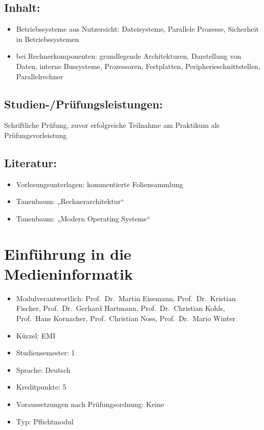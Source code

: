 \section*{Inhalt:}\label{inhalt-8}

\begin{itemize}
\tightlist
\item
  Betriebssysteme aus Nutzersicht: Dateisysteme, Parallele Prozesse,
  Sicherheit in Betriebssystemen
\item
  bei Rechnerkomponenten: grundlegende Architekturen, Darstellung von
  Daten, interne Bussysteme, Prozessoren, Festplatten,
  Peripherieschnittstellen, Parallelrechner
\end{itemize}

\section*{Studien-/Prüfungsleistungen:}\label{studien-pruxfcfungsleistungen-7}

Schriftliche Prüfung, zuvor erfolgreiche Teilnahme am Praktikum als
Prüfungsvorleistung

\section*{Literatur:}\label{literatur-6}

\begin{itemize}
\tightlist
\item
  Vorlesungsunterlagen: kommentierte Foliensammlung
\item
  Tanenbaum: „Rechnerarchitektur``
\item
  Tanenbaum: „Modern Operating Systems``
\end{itemize}

\chapter{Einführung in die
Medieninformatik}\label{einfuxfchrung-in-die-medieninformatik}

\begin{itemize}
\tightlist
\item
  Modulverantwortlich: Prof.~Dr.~Martin Eisemann, Prof.~Dr.~Kristian
  Fischer, Prof.~Dr.~Gerhard Hartmann, Prof.~Dr.~Christian Kohls,
  Prof.~Hans Kornacher, Prof.~Christian Noss, Prof.~Dr.~Mario Winter
\item
  Kürzel: EMI
\item
  Studiensemester: 1
\item
  Sprache: Deutsch
\item
  Kreditpunkte: 5
\item
  Voraussetzungen nach Prüfungsordnung: Keine
\item
  Typ: Pflichtmodul
\end{itemize}

